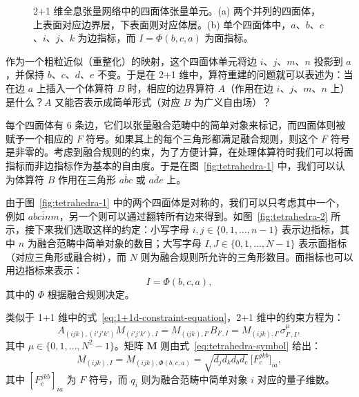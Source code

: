 \begin{figure}[htb]
  \centering
   \qquad
  \caption[2+1 维全息张量网络中的四面体张量单元]{2+1 维全息张量网络中的四面体张量单元。(a) 两个并列的四面体，上表面对应边界层，下表面则对应体层。(b) 单个四面体中，$a$、$b$、$c$、$i$、$j$、$k$ 为边指标，而 $I=\Phi(b,c,a)$ 为面指标。}
\end{figure}

作为一个粗粒近似（重整化）的映射，这个四面体单元将边 $i$、$j$、$m$、$n$ 投影到 $a$，并保持 $b$、$c$、$d$、$e$ 不变。于是在 2+1 维中，算符重建的问题就可以表述为：当在边 $a$ 上插入一个体算符 $B$ 时，相应的边界算符 $A$（作用在边 $i$、$j$、$m$、$n$ 上）是什么？$A$ 又能否表示成简单形式（对应 $B$ 为广义自由场）？

每个四面体有 6 条边，它们以张量融合范畴中的简单对象来标记，而四面体则被赋予一个相应的 $F$ 符号。如果其上的每个三角形都满足融合规则，则这个 $F$ 符号是非零的。考虑到融合规则的约束，为了方便计算，在处理体算符时我们可以将面指标而非边指标作为基本的自由度。于是在图~\ref{fig:tetrahedra-1} 中，我们可以认为体算符 $B$ 作用在三角形 $\overline{abc}$ 或 $\overline{ade}$ 上。

由于图~\ref{fig:tetrahedra-1} 中的两个四面体是对称的，我们可以只考虑其中一个，例如 $\overline{abcinm}$，另一个则可以通过翻转所有边来得到。如图~\ref{fig:tetrahedra-2} 所示，接下来我们选取这样的约定：小写字母 $i,j\in\{0,1,\dots,n-1\}$ 表示边指标，其中 $n$ 为融合范畴中简单对象的数目；大写字母 $I, J\in \{0,1,\dots,N-1\}$ 表示面指标（对应三角形或融合树），而 $N$ 则为融合规则所允许的三角形数目。面指标也可以用边指标来表示：
\begin{equation}
  I = \Phi(b,c,a),
\end{equation}
其中的 $\Phi$ 根据融合规则决定。

类似于 1+1 维中的式~\eqref{eq:1+1d-constraint-equation}，2+1 维中的约束方程为：
\begin{equation}
    A_{(ijk), (i'j'k')} M_{(i'j'k'), I}
  = M_{(ijk), I'} B_{I', I}
  = M_{(ijk), I'} \sigma^\mu_{I', I},
\end{equation}
其中 $\mu\in\{0,1,\dots,N^2-1\}$。矩阵 $\bm{M}$ 则由式~\eqref{eq:tetrahedra-symbol} 给出：
\begin{equation}
  M_{(ijk), I} = M_{(ijk), \Phi(b,c,a)} = \sqrt{d_j d_k d_b d_c} \, \bigl[ F^{jkb}_c \bigr]_{ia},
\end{equation}
其中 $[F^{jkb}_c]_{ia}$ 为 $F$ 符号，而 $q_i$ 则为融合范畴中简单对象 $i$ 对应的量子维数。

